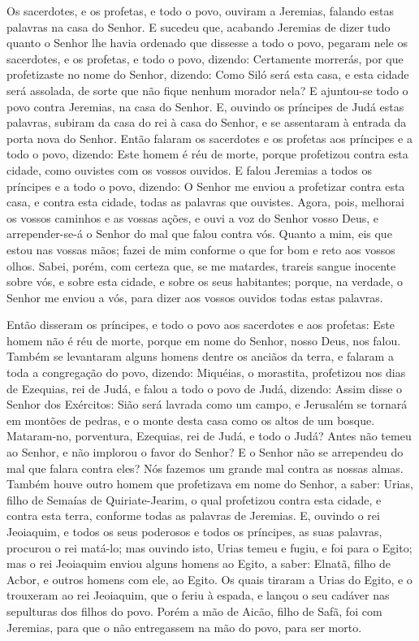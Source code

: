 Os sacerdotes, e os profetas, e todo o povo, ouviram a Jeremias,
falando estas palavras na casa do Senhor. E sucedeu que,
acabando Jeremias de dizer tudo quanto o Senhor lhe havia ordenado
que dissesse a todo o povo, pegaram nele os sacerdotes, e os
profetas, e todo o povo, dizendo: Certamente morrerás, por que
profetizaste no nome do Senhor, dizendo: Como Siló será esta casa, e
esta cidade será assolada, de sorte que não fique nenhum morador
nela? E ajuntou-se todo o povo contra Jeremias, na casa do Senhor.
E, ouvindo os príncipes de Judá estas palavras, subiram da
casa do rei à casa do Senhor, e se assentaram à entrada da porta
nova do Senhor. Então falaram os sacerdotes e os profetas aos
príncipes e a todo o povo, dizendo: Este homem é réu de morte,
porque profetizou contra esta cidade, como ouvistes com os vossos
ouvidos. E falou Jeremias a todos os príncipes e a todo o
povo, dizendo: O Senhor me enviou a profetizar contra esta casa, e
contra esta cidade, todas as palavras que ouvistes. Agora,
pois, melhorai os vossos caminhos e as vossas ações, e ouvi a voz do
Senhor vosso Deus, e arrepender-se-á o Senhor do mal que falou
contra vós. Quanto a mim, eis que estou nas vossas mãos;
fazei de mim conforme o que for bom e reto aos vossos olhos.
Sabei, porém, com certeza que, se me matardes, trareis sangue
inocente sobre vós, e sobre esta cidade, e sobre os seus habitantes;
porque, na verdade, o Senhor me enviou a vós, para dizer aos vossos
ouvidos todas estas palavras.

Então disseram os príncipes, e todo o povo aos sacerdotes e aos
profetas: Este homem não é réu de morte, porque em nome do Senhor,
nosso Deus, nos falou. Também se levantaram alguns homens
dentre os anciãos da terra, e falaram a toda a congregação do povo,
dizendo: Miquéias, o morastita, profetizou nos dias de
Ezequias, rei de Judá, e falou a todo o povo de Judá, dizendo: Assim
disse o Senhor dos Exércitos: Sião será lavrada como um campo, e
Jerusalém se tornará em montões de pedras, e o monte desta casa como
os altos de um bosque. Mataram-no, porventura, Ezequias, rei
de Judá, e todo o Judá? Antes não temeu ao Senhor, e não implorou o
favor do Senhor? E o Senhor não se arrependeu do mal que falara
contra eles? Nós fazemos um grande mal contra as nossas almas.
Também houve outro homem que profetizava em nome do Senhor, a
saber: Urias, filho de Semaías de Quiriate-Jearim, o qual profetizou
contra esta cidade, e contra esta terra, conforme todas as palavras
de Jeremias. E, ouvindo o rei Jeoiaquim, e todos os seus
poderosos e todos os príncipes, as suas palavras, procurou o rei
matá-lo; mas ouvindo isto, Urias temeu e fugiu, e foi para o Egito;
mas o rei Jeoiaquim enviou alguns homens ao Egito, a saber:
Elnatã, filho de Acbor, e outros homens com ele, ao Egito. Os
quais tiraram a Urias do Egito, e o trouxeram ao rei Jeoiaquim, que
o feriu à espada, e lançou o seu cadáver nas sepulturas dos filhos
do povo. Porém a mão de Aicão, filho de Safã, foi com
Jeremias, para que o não entregassem na mão do povo, para ser morto.

